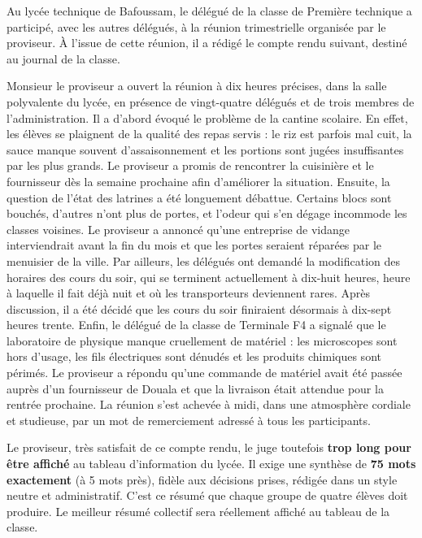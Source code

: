 \documentclass[11pt]{article}
\newcommand{\cle}[1]{{\popxbold\color{popdark}#1}}
\newcounter{popsec}
\newcounter{popsub}
\newcommand{\courssub}[1]{%
  \stepcounter{popsub}%
  \par\vspace{9pt}\noindent{\popxbold\fontsize{11.5}{13}\selectfont\color{popink}{\color{poporange}\thepopsec.\thepopsub}\hspace{6pt}#1}\par\nopagebreak\vspace{4pt}
}
\begin{document}
\courssub{Situation}

Au lycée technique de Bafoussam, le délégué de la classe de Première technique a participé, avec les autres délégués, à la réunion trimestrielle organisée par le proviseur. À l'issue de cette réunion, il a rédigé le compte rendu suivant, destiné au journal de la classe.

\begin{exemplebox}
Monsieur le proviseur a ouvert la réunion à dix heures précises, dans la salle polyvalente du lycée, en présence de vingt-quatre délégués et de trois membres de l'administration. Il a d'abord évoqué le problème de la cantine scolaire. En effet, les élèves se plaignent de la qualité des repas servis : le riz est parfois mal cuit, la sauce manque souvent d'assaisonnement et les portions sont jugées insuffisantes par les plus grands. Le proviseur a promis de rencontrer la cuisinière et le fournisseur dès la semaine prochaine afin d'améliorer la situation. Ensuite, la question de l'état des latrines a été longuement débattue. Certains blocs sont bouchés, d'autres n'ont plus de portes, et l'odeur qui s'en dégage incommode les classes voisines. Le proviseur a annoncé qu'une entreprise de vidange interviendrait avant la fin du mois et que les portes seraient réparées par le menuisier de la ville. Par ailleurs, les délégués ont demandé la modification des horaires des cours du soir, qui se terminent actuellement à dix-huit heures, heure à laquelle il fait déjà nuit et où les transporteurs deviennent rares. Après discussion, il a été décidé que les cours du soir finiraient désormais à dix-sept heures trente. Enfin, le délégué de la classe de Terminale F4 a signalé que le laboratoire de physique manque cruellement de matériel : les microscopes sont hors d'usage, les fils électriques sont dénudés et les produits chimiques sont périmés. Le proviseur a répondu qu'une commande de matériel avait été passée auprès d'un fournisseur de Douala et que la livraison était attendue pour la rentrée prochaine. La réunion s'est achevée à midi, dans une atmosphère cordiale et studieuse, par un mot de remerciement adressé à tous les participants.
\end{exemplebox}

Le proviseur, très satisfait de ce compte rendu, le juge toutefois \textbf{trop long pour être affiché} au tableau d'information du lycée. Il exige une \cle{synthèse} de \textbf{75 mots exactement} (à 5 mots près), fidèle aux décisions prises, rédigée dans un style neutre et administratif. C'est ce résumé que chaque groupe de quatre élèves doit produire. Le meilleur résumé collectif sera réellement affiché au tableau de la classe.
\end{document}
